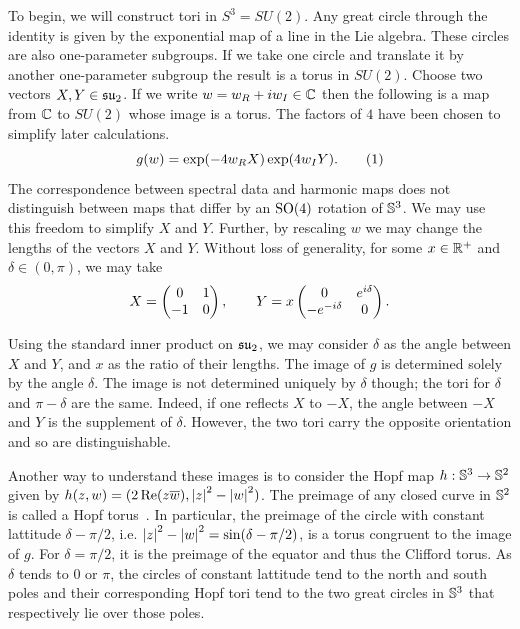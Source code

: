 \documentclass{article}
\begin{document}
To begin, we will construct tori in $S^3 = SU(2)$. Any great circle through the identity is given by the exponential map of a line in the Lie algebra. These circles are also one-parameter subgroups. If we take one circle and translate it by another one-parameter subgroup the result is a torus in $SU(2)$. Choose two vectors $X,Y\in \su_2$. If we write $w = w_R + \iu w_I \in \C$ then the following is a map from $\C$ to $SU(2)$ whose image is a torus. The factors of $4$ have been chosen to simplify later calculations. 
\[
g(w) = \exp( -4 w_R X ) \exp( 4 w_I Y ).
\labelthis{eqn:genus zero simple map}
\]
The correspondence between spectral data and harmonic maps does not distinguish between maps that differ by an $\SO(4)$ rotation of $\S^3$. We may use this freedom to simplify $X$ and $Y$. 
Further, by rescaling $w$ we may change the lengths of the vectors $X$ and $Y$. Without loss of generality, for some $x \in \R^+$ and $\delta\in (0,\pi)$, we may take 
\[
X = \begin{pmatrix}
0 & 1 \\ -1 & 0
\end{pmatrix}, \qquad
Y = x\begin{pmatrix}
0 & e^{\iu \delta} \\ -e^{-\iu \delta} & 0
\end{pmatrix}.
\]

Using the standard inner product on $\su_2$, we may consider $\delta$ as the angle between $X$ and $Y$, and $x$ as the ratio of their lengths. The image of $g$ is determined solely by the angle $\delta$. The image is not determined uniquely by $\delta$ though; the tori for $\delta$ and $\pi-\delta$ are the same. Indeed, if one reflects $X$ to $-X$, the angle between $-X$ and $Y$ is the supplement of $\delta$. However, the two tori carry the opposite orientation and so are distinguishable.

Another way to understand these images is to consider the Hopf map $h : \S^3 \to \S^2$ given by $h(z,w) = (2\Real (z\bar{w}), \abs{z}^2 - \abs{w}^2)$. The preimage of any closed curve in $\S^2$ is called a Hopf torus~\cite{Pinkall1985}. In particular, the preimage of the circle with constant lattitude $\delta-\pi/2$, i.e. $\abs{z}^2 - \abs{w}^2 = \sin(\delta - \pi/2)$, is a torus congruent to the image of $g$. For $\delta = \pi/2$, it is the preimage of the equator and thus the Clifford torus. As $\delta$ tends to $0$ or $\pi$, the circles of constant lattitude tend to the north and south poles and their corresponding Hopf tori tend to the two great circles in $\S^3$ that respectively lie over those poles.
\end{document}
